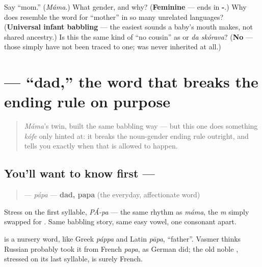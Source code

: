 \begin{tcolorbox}[breakable,colback=teal!4,colframe=teal!35!black,title={Before you move on}]
Say \textquotedblleft{}mom.\textquotedblright{} (\emph{Máma}.) What gender, and why? (\textbf{Feminine} — ends in \textbf{-}.) Why does \emph{} resemble the word for \textquotedblleft{}mother\textquotedblright{} in so many unrelated languages? (\textbf{Universal infant babbling} — the easiest sounds a baby's mouth makes, not shared ancestry.) Is this the same kind of \textquotedblleft{}no cousin\textquotedblright{} as \emph{} or \emph{da skórava}? (\textbf{No} — those simply have not been traced to one; \emph{} was never inherited at all.)
\end{tcolorbox}
\section[\texorpdfstring{\ru{папа} (pápa)}{папа (pápa)}]{ — \textquotedblleft{}dad,\textquotedblright{} the word that breaks the ending rule on purpose}

\label{lesson:RU-C12-papa}



\begin{quote}
\emph{Máma}'s twin, built the same babbling way — but this one does something \emph{kófe} only hinted at: it breaks the noun-gender ending rule outright, and tells you exactly when that is allowed to happen.
\end{quote}

\subsection*{You'll want to know first — }
\begin{quote}
\textbf{} — \emph{pápa} — \textbf{dad, papa} (the everyday, affectionate word)
\end{quote}

Stress on the first syllable, \emph{PÁ-pa} — the same rhythm as \emph{máma}, the \emph{m} simply swapped for \textbf{}. Same babbling story, same easy vowel, one consonant apart.

\begin{cousinweb}
\textbf{} is a nursery word, like Greek \emph{páppa} and Latin \emph{pāpa}, \textquotedblleft{}father\textquotedblright{}. Vasmer thinks Russian probably took it from French \emph{papa}, as German did; the old noble \emph{}, stressed on its last syllable, is surely French.
\end{cousinweb}

